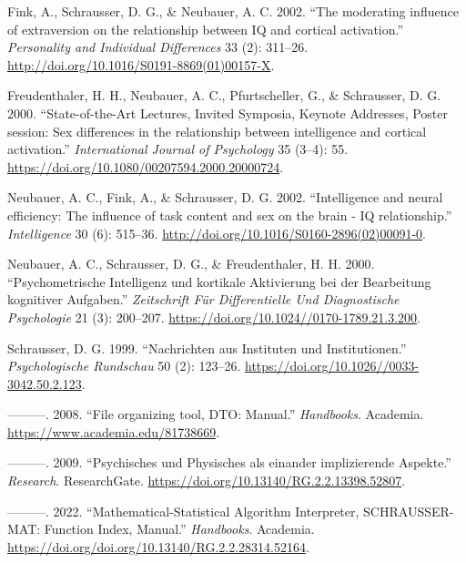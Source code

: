 \documentclass[
]{article}
\author{Dietmar Gerald SCHRAUSSER}
\date{14.04.2026}
\newlength{\cslhangindent}
\newlength{\cslentryspacingunit} %
\newenvironment{CSLReferences}[2] %
 {%
  \setlength{\parindent}{0pt}
  \ifodd #1
  \let\oldpar\par
  \def\par{\hangindent=\cslhangindent\oldpar}
  \fi
  \setlength{\parskip}{#2\cslentryspacingunit}
 }%
 {}
\begin{document}
\hypertarget{refs}{}
\begin{CSLReferences}{1}{0}
\leavevmode{}%
Fink, A., Schrausser, D. G., \& Neubauer, A. C. 2002. {``{The moderating
influence of extraversion on the relationship between IQ and cortical
activation}.''} \emph{Personality and Individual Differences} 33 (2):
311--26. \url{http://doi.org/10.1016/S0191-8869(01)00157-X}.

\leavevmode{}%
Freudenthaler, H. H., Neubauer, A. C., Pfurtscheller, G., \& Schrausser,
D. G. 2000. {``{State-of-the-Art Lectures, Invited Symposia, Keynote
Addresses, Poster session: Sex differences in the relationship between
intelligence and cortical activation}.''} \emph{International Journal of
Psychology} 35 (3--4): 55.
\url{https://doi.org/10.1080/00207594.2000.20000724}.

\leavevmode{}%
Neubauer, A. C., Fink, A., \& Schrausser, D. G. 2002. {``{Intelligence
and neural efficiency: The influence of task content and sex on the
brain - IQ relationship}.''} \emph{Intelligence} 30 (6): 515--36.
\url{http://doi.org/10.1016/S0160-2896(02)00091-0}.

\leavevmode{}%
Neubauer, A. C., Schrausser, D. G., \& Freudenthaler, H. H. 2000.
{``{Psychometrische Intelligenz und kortikale Aktivierung bei der
Bearbeitung kognitiver Aufgaben}.''} \emph{{Zeitschrift Für
Differentielle Und Diagnostische Psychologie}} 21 (3): 200--207.
\url{https://doi.org/10.1024//0170-1789.21.3.200}.

\leavevmode{}%
Schrausser, D. G. 1999. {``{Nachrichten aus Instituten und
Institutionen}.''} \emph{Psychologische Rundschau} 50 (2): 123--26.
\url{https://doi.org/10.1026//0033-3042.50.2.123}.

\leavevmode{}%
---------. 2008. {``{File organizing tool, DTO: Manual}.''}
\emph{Handbooks}. Academia. \url{https://www.academia.edu/81738669}.

\leavevmode{}%
---------. 2009. {``{Psychisches und Physisches als einander
implizierende Aspekte}.''} \emph{Research}. ResearchGate.
\url{https://doi.org/10.13140/RG.2.2.13398.52807}.

\leavevmode{}%
---------. 2022. {``{Mathematical-Statistical Algorithm Interpreter,
SCHRAUSSER-MAT: Function Index, Manual}.''} \emph{Handbooks}. Academia.
\url{https://doi.org/doi.org/10.13140/RG.2.2.28314.52164}.


\end{CSLReferences}
\end{document}
